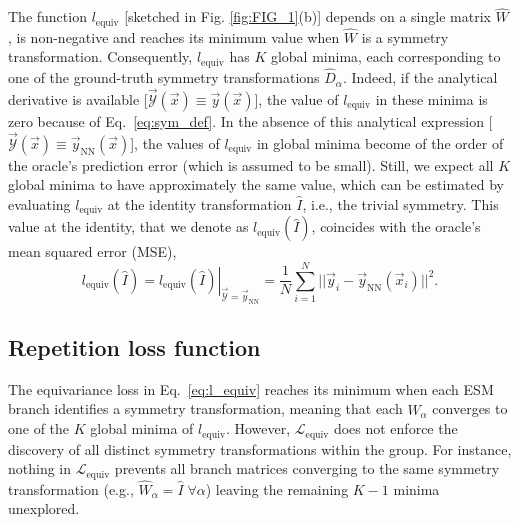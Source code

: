 The function $l_{\mathrm{equiv}}$ [sketched in Fig. \ref{fig:FIG_1}(b)] depends on a single matrix $\hat{W}$, is non-negative and reaches its minimum value when $\hat{W}$ is a symmetry transformation. Consequently, $l_{\mathrm{equiv}}$ has $K$ global minima, each corresponding to one of the ground-truth symmetry transformations $\hat{D}_{\alpha}$. Indeed, if the analytical derivative is available [$\vec{\mathcal{Y}} (\vec{x}) \equiv \vec{y}(\vec{x})$], the value of $l_{\mathrm{equiv}}$ in these minima is zero because of Eq.~\ref{eq:sym_def}.  In the absence of this analytical expression  [$\vec{\mathcal{Y}} (\vec{x}) \equiv \vec{y}_{\mathrm{NN}}(\vec{x})$], the values of $l_{\mathrm{equiv}}$ in global minima become of the order of the oracle's prediction error (which is assumed to be small). Still, we expect all $K$ global minima to have approximately the same value, which can be estimated by evaluating $l_{\mathrm{equiv}}$ at the identity transformation $\hat{I}$, i.e., the trivial symmetry. This value at the identity, that we denote as $l_{\mathrm{equiv}}(\hat{I})$, coincides with the oracle's mean squared error (MSE),
\begin{equation}\label{eq:oracle_mse}
  l_{\mathrm{equiv}}(\hat{I}) = \left. l_{\mathrm{equiv}} \left( \hat{I} \right) \right|_{\vec{\mathcal{Y}} = \vec{y}_{\mathrm{NN}}} = \frac{1}{N} \sum_{i=1}^{N} || \vec{y}_i - \vec{y}_{\mathrm{NN}} ( \vec{x}_i  ) ||^2.
\end{equation}


\subsection{Repetition loss function}\label{sec:rep_loss}

The equivariance loss in Eq.~\ref{eq:l_equiv} reaches its minimum when each ESM branch identifies a symmetry transformation, meaning that each $\hat{W}_{\alpha}$ converges to one of the $K$ global minima of $l_{\mathrm{equiv}}$. However, $\mathcal{L}_{\mathrm{equiv}}$ does not enforce the discovery of all distinct symmetry transformations within the group. For instance, nothing in $\mathcal{L}_{\mathrm{equiv}}$ prevents all branch matrices converging to the same symmetry transformation (e.g., $\hat{W}_{\alpha} = \hat{I} \; \forall \alpha$) leaving the remaining $K-1$ minima unexplored.


